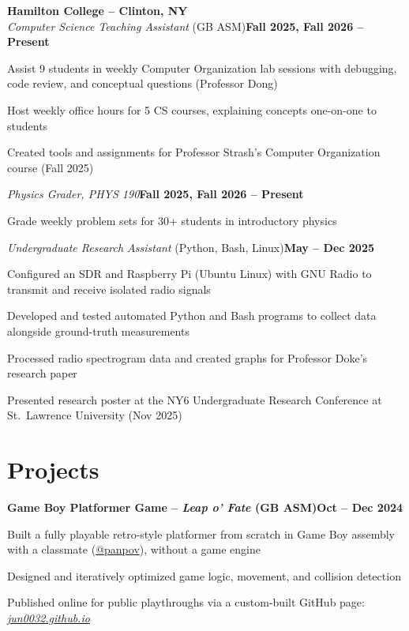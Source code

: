 \documentclass[letterpaper,10pt]{article}
\newcommand{\heading}[2]{
  \hspace{10pt}#1\hfill#2\\
}
\newcommand{\headingBf}[2]{
  \heading{\textbf{#1}}{\textbf{#2}}
}
\newenvironment{resume_list}{
  \vspace{-7pt}
  \begin{itemize}[itemsep=-2px, parsep=1pt, leftmargin=30pt]
}{
  \end{itemize}
}
\begin{document}
  \vspace{4pt}
  \headingBf{Hamilton College -- Clinton, NY}{}
  \heading{\textit{Computer Science Teaching Assistant} \textnormal{(GB ASM)}}{\textbf{Fall 2025, Fall 2026 -- Present}}
  \begin{resume_list}
    \item Assist 9 students in weekly Computer Organization lab sessions with debugging, code review, and conceptual questions (Professor Dong)
    \item Host weekly office hours for 5 CS courses, explaining concepts one-on-one to students
    \item Created tools and assignments for Professor Strash's Computer Organization course (Fall 2025)
  \end{resume_list}

  \heading{\textit{Physics Grader, PHYS 190}}{\textbf{Fall 2025, Fall 2026 -- Present}}
  \begin{resume_list}
    \item Grade weekly problem sets for 30+ students in introductory physics
  \end{resume_list}

  \heading{\textit{Undergraduate Research Assistant} \textnormal{(Python, Bash, Linux)}}{\textbf{May -- Dec 2025}}
  \begin{resume_list}
    \item Configured an SDR and Raspberry Pi (Ubuntu Linux) with GNU Radio to transmit and receive isolated radio signals
    \item Developed and tested automated Python and Bash programs to collect data alongside ground-truth measurements
    \item Processed radio spectrogram data and created graphs for Professor Doke's research paper
    \item Presented research poster at the NY6 Undergraduate Research Conference at St.\ Lawrence University (Nov 2025)
  \end{resume_list}


  \section{Projects}

  \headingBf{Game Boy Platformer Game -- \textit{Leap o' Fate} \textnormal{(GB ASM)}}{Oct -- Dec 2024}
  \begin{resume_list}
    \item Built a fully playable retro-style platformer from scratch in Game Boy assembly with a classmate (\href{https://github.com/panpov}{@panpov}), without a game engine
    \item Designed and iteratively optimized game logic, movement, and collision detection
    \item Published online for public playthroughs via a custom-built GitHub page: \textit{\textcolor{blue}{\href{https://jun0032.github.io}{jun0032.github.io}}}
  \end{resume_list}
\end{document}
